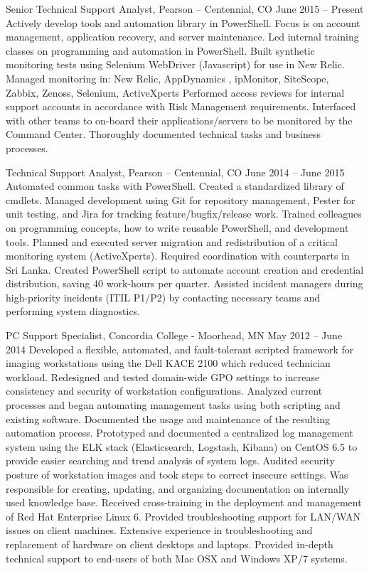 Senior Technical Support Analyst, Pearson – Centennial, CO
June 2015 – Present
Actively develop tools and automation library in PowerShell. Focus is on account management, application recovery, and server maintenance.
Led internal training classes on programming and automation in PowerShell.
Built synthetic monitoring tests using Selenium WebDriver (Javascript) for use in New Relic.
Managed monitoring in: New Relic, AppDynamics , ipMonitor, SiteScope, Zabbix, Zenoss, Selenium, ActiveXperts
Performed access reviews for internal support accounts in accordance with Risk Management requirements.
Interfaced with other teams to on-board their applications/servers to be monitored by the Command Center.
Thoroughly documented technical tasks and business processes.

Technical Support Analyst, Pearson – Centennial, CO
June 2014 – June 2015
Automated common tasks with PowerShell. Created a standardized library of cmdlets. Managed development using Git for repository management, Pester for unit testing, and Jira for tracking feature/bugfix/release work.
Trained colleagues on programming concepts, how to write reusable PowerShell, and development tools.
Planned and executed server migration and redistribution of a critical monitoring system (ActiveXperts). Required coordination with counterparts in Sri Lanka.
Created PowerShell script to automate account creation and credential distribution, saving 40 work-hours per quarter.
Assisted incident managers during high-priority incidents (ITIL P1/P2) by contacting necessary teams and performing system diagnostics.

PC Support Specialist, Concordia College - Moorhead, MN
May 2012 – June 2014
Developed a flexible, automated, and fault-tolerant scripted framework for imaging workstations using the Dell KACE 2100 which reduced technician workload.
Redesigned and tested domain-wide GPO settings to increase consistency and security of workstation configurations.
Analyzed current processes and began automating management tasks using both scripting and existing software. Documented the usage and maintenance of the resulting automation process.
Prototyped and documented a centralized log management system using the ELK stack (Elasticsearch, Logstash, Kibana) on CentOS 6.5 to provide easier searching and trend analysis of system logs.
Audited security posture of workstation images and took steps to correct insecure settings.
Was responsible for creating, updating, and organizing documentation on internally used knowledge base.
Received cross-training in the deployment and management of Red Hat Enterprise Linux 6.
Provided troubleshooting support for LAN/WAN issues on client machines.
Extensive experience in troubleshooting and replacement of hardware on client desktops and laptops.
Provided in-depth technical support to end-users of both Mac OSX and Windows XP/7 systems.

